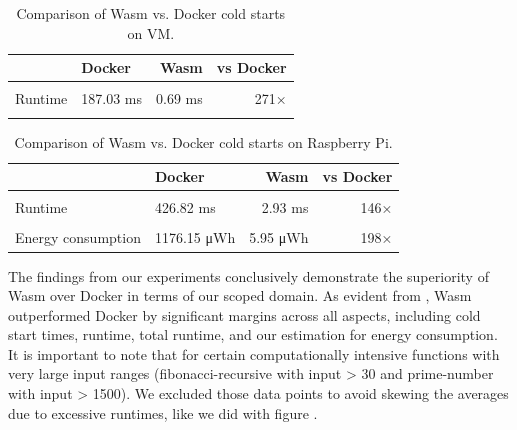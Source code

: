\documentclass[
  table]{report}
\begin{document}
\begin{table}[H]
\centering
\caption{\label{tab:nrec_data_table}Comparison of Wasm vs. Docker cold starts on VM.\label{tab:nrec-avg}}
\centering
\begin{tabular}[t]{llrr}
\toprule
  & Docker & Wasm & vs Docker\\
\midrule
\cellcolor{gray!10}{Cold start} & \cellcolor{gray!10}{324.66 ms} & \cellcolor{gray!10}{0.89 ms} & \cellcolor{gray!10}{365×}\\
Runtime & 187.03 ms & 0.69 ms & 271×\\
\cellcolor{gray!10}{Total runtime} & \cellcolor{gray!10}{511.69 ms} & \cellcolor{gray!10}{1.58 ms} & \cellcolor{gray!10}{324×}\\
\bottomrule
\end{tabular}
\end{table}

\begin{table}[H]
\centering
\caption{\label{tab:rpi_data_table}Comparison of Wasm vs. Docker cold starts on Raspberry Pi.\label{tab:rpi-avg}}
\centering
\begin{tabular}[t]{llrr}
\toprule
  & Docker & Wasm & vs Docker\\
\midrule
\cellcolor{gray!10}{Cold start} & \cellcolor{gray!10}{692.36 ms} & \cellcolor{gray!10}{3.19 ms} & \cellcolor{gray!10}{217×}\\
Runtime & 426.82 ms & 2.93 ms & 146×\\
\cellcolor{gray!10}{Total runtime} & \cellcolor{gray!10}{1119.18 ms} & \cellcolor{gray!10}{6.12 ms} & \cellcolor{gray!10}{183×}\\
Energy consumption & 1176.15 μWh & 5.95 μWh & 198×\\
\bottomrule
\end{tabular}
\end{table}

The findings from our experiments conclusively demonstrate the
superiority of \ac{Wasm} over Docker in terms of our scoped domain. As
evident from , Wasm outperformed Docker
by significant margins across all aspects, including cold start times,
runtime, total runtime, and our estimation for energy consumption. It is
important to note that for certain computationally intensive functions
with very large input ranges (fibonacci-recursive with input
\textgreater{} 30 and prime-number with input \textgreater{} 1500). We
excluded those data points to avoid skewing the averages due to
excessive runtimes, like we did with figure
.
\end{document}
